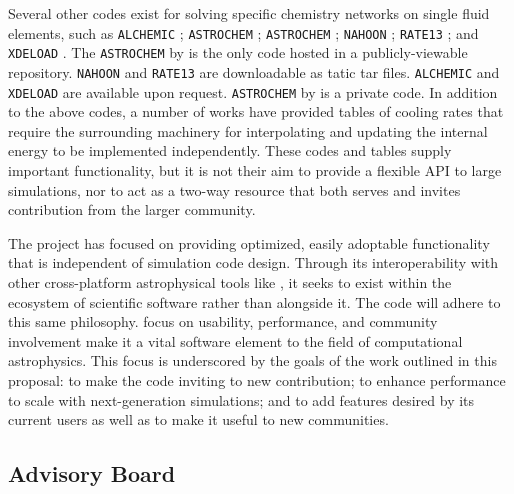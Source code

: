 Several other codes exist for solving specific chemistry
networks on single fluid elements, such as 
\texttt{ALCHEMIC} \citep{2010A&A...522A..42S}; \texttt{ASTROCHEM}
\citep{2013MNRAS.431..455K}; \texttt{ASTROCHEM} \citep[][unrelated to
the first \texttt{ASTROCHEM}]{2013A&A...559A..53M}; \texttt{NAHOON}
\citep{2012ApJS..199...21W}; \texttt{RATE13} \citep[associated with
  the UMIST database][]{2013A&A...550A..36M}; and \texttt{XDELOAD}
\citep{2005Ap&SS.299....1N}.  The \texttt{ASTROCHEM} by
\citet{2013A&A...559A..53M} is the only code hosted in a
publicly-viewable repository.  \texttt{NAHOON} and \texttt{RATE13} are
downloadable as tatic tar files.  \texttt{ALCHEMIC} and
\texttt{XDELOAD} are available upon request.  \texttt{ASTROCHEM} by
\citet{2013MNRAS.431..455K} is a private code.
In addition to the above codes, a number of works have provided tables
of cooling rates \citep{1993ApJS...88..253S, 2009MNRAS.393...99W,
2013MNRAS.434.1043O} that require the surrounding machinery for
interpolating and updating the internal energy to be implemented
independently.
These codes and tables supply important functionality, but it is
not their aim to provide a flexible API to large simulations, nor to
act as a two-way resource that both serves and invites contribution
from the larger community.

The \grackle{} project has focused on providing optimized, easily
adoptable functionality that is independent of simulation code
design.  Through its interoperability with other cross-platform
astrophysical tools like \yt{}, it seeks to exist within the
ecosystem of scientific software rather than alongside it.  The
\dengo{} code will adhere to this same philosophy.
 focus on usability, performance, and community
involvement make it a vital software element to the field of
computational astrophysics.  This focus is underscored by the goals
of the work outlined in this proposal:
to make the code inviting to new contribution; to enhance performance
to scale with next-generation simulations; and to add features desired
by its current users as well as to make it useful to new communities.

\subsection{Advisory Board}


